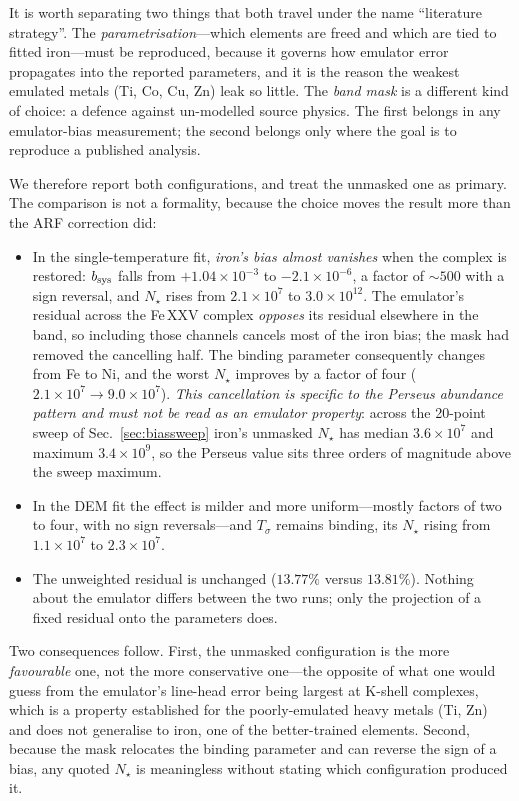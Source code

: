 \documentclass[11pt,a4paper]{article}
\begin{document}
It is worth separating two things that both travel under the name ``literature
strategy''. The \emph{parametrisation}---which elements are freed and which are
tied to fitted iron---must be reproduced, because it governs how emulator error
propagates into the reported parameters, and it is the reason the weakest
emulated metals (Ti, Co, Cu, Zn) leak so little. The \emph{band mask} is a
different kind of choice: a defence against un-modelled source physics. The
first belongs in any emulator-bias measurement; the second belongs only where
the goal is to reproduce a published analysis.

We therefore report both configurations, and treat the unmasked one as
primary. The comparison is not a formality, because the choice moves the
result more than the ARF correction did:

\begin{itemize}
\item In the single-temperature fit, \emph{iron's bias almost vanishes} when
the complex is restored: $b_{\rm sys}$ falls from $+1.04\times10^{-3}$ to
$-2.1\times10^{-6}$, a factor of ${\sim}500$ with a sign reversal, and
$N_\star$ rises from $2.1\times10^{7}$ to $3.0\times10^{12}$. The emulator's
residual across the Fe\,XXV complex \emph{opposes} its residual elsewhere in
the band, so including those channels cancels most of the iron bias; the mask
had removed the cancelling half. The binding parameter consequently changes
from Fe to Ni, and the worst $N_\star$ improves by a factor of four
($2.1\times10^{7}\to9.0\times10^{7}$). \emph{This cancellation is specific to
the Perseus abundance pattern and must not be read as an emulator property}:
across the 20-point sweep of Sec.~\ref{sec:biassweep} iron's unmasked
$N_\star$ has median $3.6\times10^{7}$ and maximum $3.4\times10^{9}$, so the
Perseus value sits three orders of magnitude above the sweep maximum.
\item In the DEM fit the effect is milder and more uniform---mostly factors of
two to four, with no sign reversals---and $T_\sigma$ remains binding, its
$N_\star$ rising from $1.1\times10^{7}$ to $2.3\times10^{7}$.
\item The unweighted residual is unchanged ($13.77\%$ versus $13.81\%$). Nothing
about the emulator differs between the two runs; only the projection of a fixed
residual onto the parameters does.
\end{itemize}

Two consequences follow. First, the unmasked configuration is the more
\emph{favourable} one, not the more conservative one---the opposite of what one
would guess from the emulator's line-head error being largest at K-shell
complexes, which is a property established for the poorly-emulated heavy metals
(Ti, Zn) and does not generalise to iron, one of the better-trained elements.
Second, because the mask relocates the binding parameter and can reverse the
sign of a bias, any quoted $N_\star$ is meaningless without stating which
configuration produced it.
\end{document}
